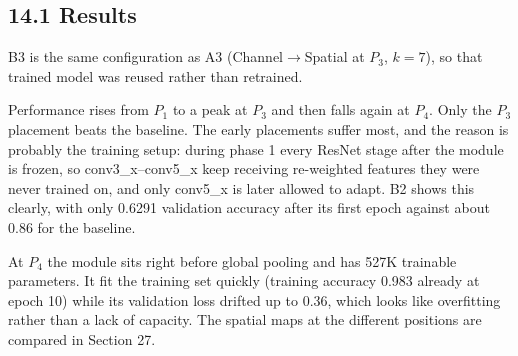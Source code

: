 \documentclass[10pt]{article}
\begin{document}
\subsection*{14.1 Results}

B3 is the same configuration as A3 (Channel$\rightarrow$Spatial at $P_3$,
$k=7$), so that trained model was reused rather than retrained.

\begin{center}
\end{center}

Performance rises from $P_1$ to a peak at $P_3$ and then falls again at $P_4$.
Only the $P_3$ placement beats the baseline. The early placements suffer most,
and the reason is probably the training setup: during phase 1 every ResNet
stage after the module is frozen, so conv3\_x--conv5\_x keep receiving
re-weighted features they were never trained on, and only conv5\_x is later
allowed to adapt. B2 shows this clearly, with only 0.6291 validation accuracy
after its first epoch against about 0.86 for the baseline.

At $P_4$ the module sits right before global pooling and has 527K trainable
parameters. It fit the training set quickly (training accuracy 0.983 already at
epoch 10) while its validation loss drifted up to 0.36, which looks like
overfitting rather than a lack of capacity. The spatial maps at the different
positions are compared in Section 27.
\end{document}
